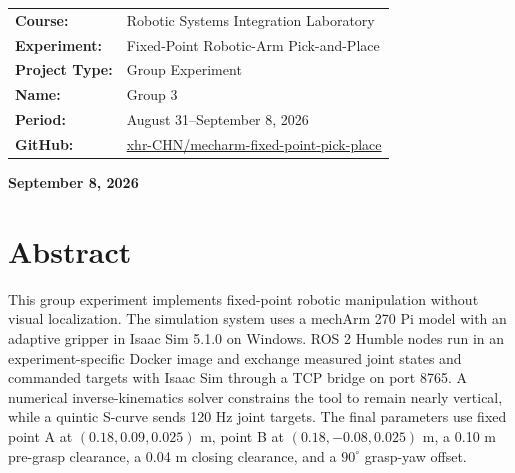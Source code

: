 \documentclass[UTF8,zihao=-4,scheme=chinese,fontset=none]{ctexart}
\begin{document}
\begin{titlepage}\thispagestyle{empty}\begin{center}
\vspace{2.2cm}\renewcommand{\arraystretch}{1.8}
\begin{tabular}{>{\bfseries}p{3.2cm}p{8.2cm}}
Course: & Robotic Systems Integration Laboratory\\
Experiment: & Fixed-Point Robotic-Arm Pick-and-Place\\
Project Type: & Group Experiment\\
Name: & Group 3\\
Period: & August 31--September 8, 2026\\
GitHub: & \href{https://github.com/xhr-CHN/mecharm-fixed-point-pick-place}{xhr-CHN/mecharm-fixed-point-pick-place}\\
\end{tabular}
\vfill{\bfseries{}September 8, 2026\par}
\end{center}\end{titlepage}

\setcounter{page}{1}
\section*{Abstract}
This group experiment implements fixed-point robotic manipulation without visual localization. The simulation system uses a mechArm 270 Pi model with an adaptive gripper in Isaac Sim 5.1.0 on Windows. ROS 2 Humble nodes run in an experiment-specific Docker image and exchange measured joint states and commanded targets with Isaac Sim through a TCP bridge on port 8765. A numerical inverse-kinematics solver constrains the tool to remain nearly vertical, while a quintic S-curve sends 120 Hz joint targets. The final parameters use fixed point A at $(0.18,0.09,0.025)$ m, point B at $(0.18,-0.08,0.025)$ m, a 0.10 m pre-grasp clearance, a 0.04 m closing clearance, and a $90^{\circ}$ grasp-yaw offset.
\end{document}
